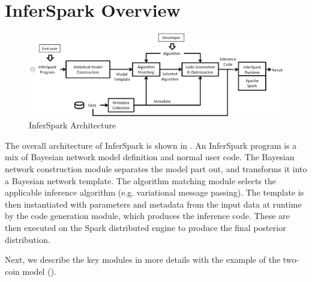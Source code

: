 \section{InferSpark Overview}
\label{sec:framework}

\begin{figure}[th]
\centering
    \includegraphics[width=0.8\linewidth]{figs/workflow_future.eps}
    \caption{InferSpark Architecture}
    \label{fig:workflow}
\end{figure}



The overall architecture of InferSpark is shown in .  An
InferSpark program is a mix of Bayesian network model definition and normal
user code. The Bayesian network construction module separates the model part
out, and transforms it into a Bayesian network template. The algorithm
matching module selects the applicable inference algorithm (e.g. variational
message passing). The template is
then instantiated with parameters and metadata from the input data at runtime
by the code generation module, which produces the inference code. These are
then executed on the Spark distributed engine to produce the final posterior
distribution.


Next, we describe the key modules in more details with the example of the
two-coin model (). 

